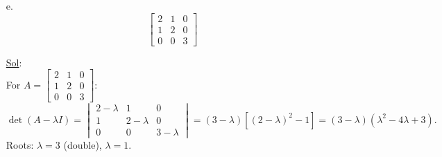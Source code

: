 \begin{enumerate}
\begin{enumerate}
      \item[e.] \[
          \begin{bmatrix}
            2 & 1 & 0 \\
            1 & 2 & 0 \\
            0 & 0 & 3
          \end{bmatrix}
        \]

        \underline{Sol}:\\
        For \(A =
          \begin{bmatrix} 2 & 1 & 0 \\ 1 & 2 & 0 \\ 0 & 0 & 3
        \end{bmatrix}\):
        \[
          \det(A - \lambda I) =
          \begin{vmatrix} 2 - \lambda & 1 & 0 \\ 1 & 2 - \lambda & 0
            \\ 0 & 0 & 3 - \lambda
          \end{vmatrix} = (3 - \lambda)\left[(2 - \lambda)^2 -
          1\right] = (3 - \lambda)(\lambda^2 - 4\lambda + 3).
        \]
        Roots: \(\lambda = 3\) (double), \(\lambda = 1\).


\end{enumerate}
\end{enumerate}
